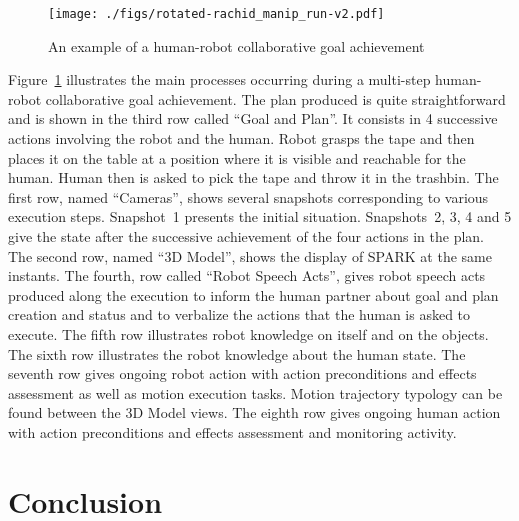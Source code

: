 \documentclass{svmult}
\begin{document}
\begin{figure}[thpb]
  \centering
\texttt{[image: ./figs/rotated-rachid\_manip\_run-v2.pdf]} \\
\begin{center}
  \caption {An example of a human-robot collaborative goal achievement}
\end{center}
  \label{manip_run_fg}
\end{figure}



Figure~\ref{manip_run_fg} illustrates the main processes occurring
during a multi-step human-robot collaborative goal achievement.  The
plan produced is quite straightforward and is shown in the third row
called ``Goal and Plan''. It consists in 4 successive actions
involving the robot and the human. Robot grasps the tape and then
places it on the table at a position where it is visible and reachable
for the human. Human then is asked to pick the tape and throw it in
the trashbin. The first row, named ``Cameras'', shows several
snapshots corresponding to various execution steps. Snapshot~1
presents the initial situation. Snapshots~2, 3, 4 and 5 give the state
after the successive achievement of the four actions in the plan. The
second row, named ``3D Model'', shows the display of SPARK at the same
instants. The fourth, row called ``Robot Speech Acts'', gives robot
speech acts produced along the execution to inform the human partner
about goal and plan creation and status and to verbalize the actions
that the human is asked to execute. The fifth row illustrates robot
knowledge on itself and on the objects. The sixth row illustrates the
robot knowledge about the human state. The seventh row gives ongoing
robot action with action preconditions and effects assessment as well
as motion execution tasks. Motion trajectory typology can be found
between the 3D Model views. The eighth row gives ongoing human action
with action preconditions and effects assessment and monitoring
activity.




\section{Conclusion}
\label{conclusion}
\end{document}
